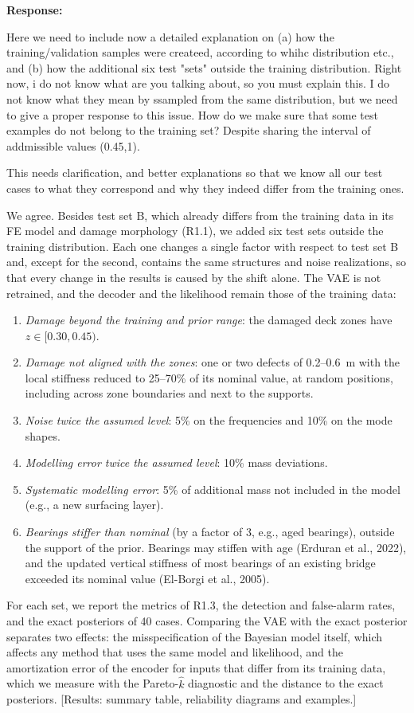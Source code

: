 \documentclass[11pt]{article}
\newenvironment{response}{\par\smallskip\noindent\color{resp}\textbf{Response:}\ }{\par}
\newcommand{\tbd}[1]{\textcolor{note}{\textsf{[#1]}}}
\begin{document}
\begin{response}
	
Here we need to include now a detailed explanation on (a) how the training/validation samples were createed, according to whihc distribution etc., and (b) how the additional six test "sets" outside the training distribution. Right now, i do not know what are you talking about, so you must explain this. 
I do not know what they mean by ssampled from the same distribution, but we need to give a proper response to this issue. How do we make sure that some test examples do not belong to the training set? Despite sharing the interval of addmissible values (0.45,1). 

This needs clarification, and better explanations so that we know all our test cases to what they correspond and why they indeed differ from the training ones. 



We agree. Besides test set B, which already differs from the training data in its FE model and damage morphology (R1.1),
we added six test sets outside the training distribution. Each one changes a single factor with respect to test set B
and, except for the second, contains the same structures and noise realizations, so that every change in the results is
caused by the shift alone. The VAE is not retrained, and the decoder and the likelihood remain those of the training
data:
\begin{enumerate}[leftmargin=*]
\item \emph{Damage beyond the training and prior range}: the damaged deck zones have $z\in[0.30,0.45)$.
\item \emph{Damage not aligned with the zones}: one or two defects of 0.2--0.6~m with the local stiffness reduced to
25--70\% of its nominal value, at random positions, including across zone boundaries and next to the supports.
\item \emph{Noise twice the assumed level}: 5\% on the frequencies and 10\% on the mode shapes.
\item \emph{Modelling error twice the assumed level}: 10\% mass deviations.
\item \emph{Systematic modelling error}: 5\% of additional mass not included in the model (e.g., a new surfacing layer).
\item \emph{Bearings stiffer than nominal} (by a factor of 3, e.g., aged bearings), outside the support of
the prior. Bearings may stiffen with age (Erduran et al., 2022), and the updated vertical stiffness of most bearings of
an existing bridge exceeded its nominal value (El-Borgi et al., 2005).
\end{enumerate}
For each set, we report the metrics of R1.3, the detection and false-alarm rates, and the exact posteriors of 40 cases.
Comparing the VAE with the exact posterior separates two effects: the misspecification of the Bayesian model itself,
which affects any method that uses the same model and likelihood, and the amortization error of the encoder for inputs
that differ from its training data, which we measure with the Pareto-$\hat{k}$ diagnostic and the distance to the exact
posteriors.
\tbd{Results: summary table, reliability diagrams and examples.}
\end{response}
\end{document}
